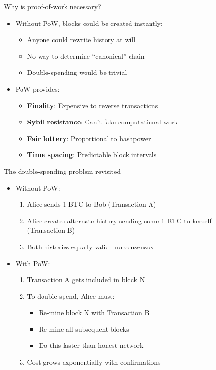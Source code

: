 \documentclass[aspectratio=169, lualatex, handout]{beamer}
\begin{document}
\begin{frame}{Why is proof-of-work necessary?}
	\begin{itemize}
		\item Without PoW, blocks could be created instantly:
		      \begin{itemize}
			      \item Anyone could rewrite history at will
			      \item No way to determine ``canonical'' chain
			      \item Double-spending would be trivial
		      \end{itemize}
		\item PoW provides:
		      \begin{itemize}
			      \item \textbf{Finality}: Expensive to reverse transactions
			      \item \textbf{Sybil resistance}: Can't fake computational work
			      \item \textbf{Fair lottery}: Proportional to hashpower
			      \item \textbf{Time spacing}: Predictable block intervals
		      \end{itemize}
	\end{itemize}
\end{frame}

\begin{frame}{The double-spending problem revisited}
	\begin{itemize}
		\item Without PoW:
		      \begin{enumerate}
			      \item Alice sends 1 BTC to Bob (Transaction A)
			      \item Alice creates alternate history sending same 1 BTC to herself (Transaction B)
			      \item Both histories equally valid \rightarrow\ no consensus
		      \end{enumerate}
		\item With PoW:
		      \begin{enumerate}
			      \item Transaction A gets included in block N
			      \item To double-spend, Alice must:
			            \begin{itemize}
				            \item Re-mine block N with Transaction B
				            \item Re-mine all subsequent blocks
				            \item Do this faster than honest network
			            \end{itemize}
			      \item Cost grows exponentially with confirmations
		      \end{enumerate}
	\end{itemize}
\end{frame}
\end{document}
